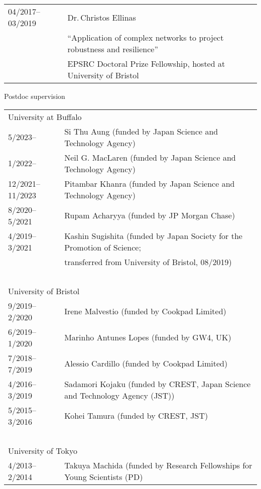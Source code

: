\documentclass[11pt,letter]{article}
\renewenvironment{itemize}{
  \begin{list}{}{
    \setlength{\leftmargin}{1.5em}
    \setlength{\itemsep}{0.25em}
    \setlength{\parskip}{0pt}
    \setlength{\parsep}{0.25em}
  }
}{
  \end{list}
}
\begin{document}
\begin{itemize}
\medskip

\begin{tabular}{ll}
04/2017--03/2019 & Dr.\,Christos Ellinas\\
& ``Application of complex networks to project robustness and resilience''\\
& EPSRC Doctoral Prize Fellowship, hosted at University of Bristol
\end{tabular}

\bigskip


\item Postdoc supervision

\medskip

\begin{tabular}{ll}
\multicolumn{2}{l}{University at Buffalo}\\[1.5mm]
5/2023-- & Si Thu Aung (funded by Japan Science and Technology Agency)\\
%
1/2022-- & Neil G. MacLaren (funded by Japan Science and Technology Agency)\\
%
12/2021--11/2023 & Pitambar Khanra (funded by Japan Science and Technology Agency)\\
%
8/2020--5/2021 & Rupam Acharyya (funded by JP Morgan Chase)\\
%
4/2019--3/2021 & Kashin Sugishita (funded by Japan Society for the Promotion of Science;\\
& transferred from University of Bristol, 08/2019)\\
\ \\
\multicolumn{2}{l}{University of Bristol}\\[1.5mm]
9/2019--2/2020 & Irene Malvestio (funded by Cookpad Limited)\\
%
6/2019--1/2020 & Marinho Antunes Lopes (funded by GW4, UK)\\
%
7/2018--7/2019 & Alessio Cardillo (funded by Cookpad Limited)\\
%
4/2016--3/2019 & Sadamori Kojaku (funded by CREST, Japan Science and Technology Agency (JST))\\
%
5/2015--3/2016 & Kohei Tamura (funded by CREST, JST)\\
%
\ \\
\multicolumn{2}{l}{University of Tokyo}\\[1.5mm]
4/2013--2/2014 & Takuya Machida (funded by Research Fellowships for Young Scientists (PD) \\

\end{tabular}
\end{itemize}
\end{document}
